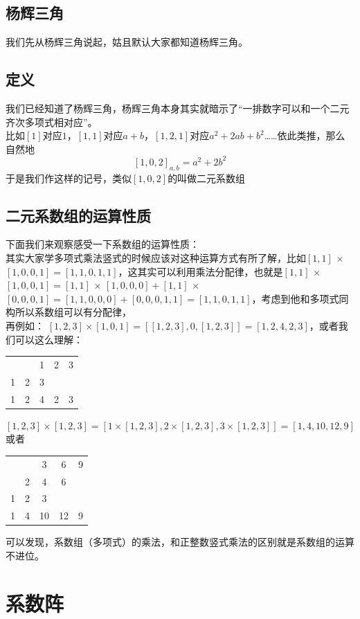 \documentclass[UTF8]{ctexart}
\begin{document}
\subsection{杨辉三角}
我们先从杨辉三角说起，姑且默认大家都知道杨辉三角。
\subsection{定义}
我们已经知道了杨辉三角，杨辉三角本身其实就暗示了“一排数字可以和一个二元齐次多项式相对应”。\\
比如$ [1] $对应$ 1 $，$ [1,1] $对应$ a+b $，$ [1,2,1] $对应$ a^{2}+2ab+b^{2} $……依此类推，那么自然地
$$[1,0,2]_{a, b}=a^{2}+2 b^{2}$$
于是我们作这样的记号，类似$ [1,0,2] $的叫做二元系数组
\subsection{二元系数组的运算性质}
下面我们来观察感受一下系数组的运算性质：\\
其实大家学多项式乘法竖式的时候应该对这种运算方式有所了解，比如$ [1,1]$ × $[1,0,0,1]=[1,1,0,1,1] $，这其实可以利用乘法分配律，也就是$ [1,1]$ × $[1,0,0,1]=[1,1]$ × $[1,0,0,0]+[1,1]$ × $[0,0,0,1]=[1,1,0,0,0]+[0,0,0,1,1]=[1,1,0,1,1] $，考虑到他和多项式同构所以系数组可以有分配律，\\
再例如：
$[1,2,3] \times[1,0,1]=[[1,2,3], 0,[1,2,3]]=[1,2,4,2,3]$，或者我们可以这么理解：
\begin{center}
	\begin{tabular}{ccccc}
		&  & 1 & 2 & 3 \\
		1& 2 & 3 &  &  \\
		\hline
		1& 2 & 4 & 2 & 3 \\
	\end{tabular}
\end{center}
$[1,2,3] \times[1,2,3]=[1 \times[1,2,3], 2 \times[1,2,3], 3 \times[1,2,3]]=[1,4,10,12,9]$或者
\begin{center}
	\begin{tabular}{ccccc}
		
		&  & 3 & 6 & 9 \\
		& 2 & 4 & 6 &  \\
		1& 2 & 3 &  &  \\
		\hline
		1& 4 & 10 & 12 & 9 \\
	\end{tabular}
\end{center}
可以发现，系数组（多项式）的乘法，和正整数竖式乘法的区别就是系数组的运算不进位。
\section{系数阵}
\end{document}
